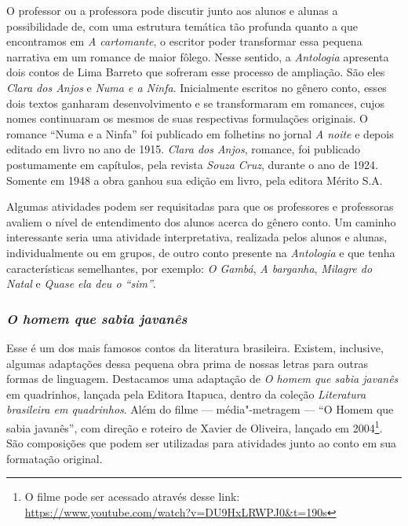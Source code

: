\documentclass[11pt]{extarticle}
\begin{document}
{{O professor ou a professora pode discutir junto aos alunos e alunas a
possibilidade de, com uma estrutura temática tão profunda quanto a que
encontramos em {\textit{A cartomante}}, o escritor poder transformar 
essa pequena narrativa em um romance de maior fôlego. Nesse
sentido, a \emph{Antologia} apresenta dois contos de Lima Barreto que
sofreram esse processo de ampliação. São eles {\textit{Clara dos
Anjos}} e {\textit{Numa e a Ninfa}}. Inicialmente escritos no
gênero conto, esses dois textos ganharam desenvolvimento e se
transformaram em romances, cujos nomes continuaram os mesmos de suas
respectivas formulações originais. O romance ``Numa e a Ninfa'' foi
publicado em folhetins no jornal \emph{A noite} e depois editado em
livro no ano de 1915. \emph{Clara dos Anjos}, romance, foi publicado
postumamente em capítulos, pela revista \emph{Souza Cruz}, durante o ano
de 1924. Somente em 1948 a obra ganhou sua edição em livro, pela editora
Mérito S.A.










Algumas atividades podem ser requisitadas para que os professores e
professoras avaliem o nível de entendimento dos alunos acerca do gênero
conto. Um caminho interessante seria uma atividade interpretativa,
realizada pelos alunos e alunas, individualmente ou em grupos, de outro
conto presente na \emph{Antologia} e que tenha características
semelhantes, por exemplo: {\textit{O Gambá}}, {\textit{A
barganha}}, {\textit{Milagre do Natal}} e {\textit{Quase ela
deu o ``sim''}}.

\subsubsection{\textit{O homem que sabia javanês}}

Esse é um dos mais famosos contos da literatura brasileira. Existem,
inclusive, algumas adaptações dessa pequena obra prima de nossas letras
para outras formas de linguagem. Destacamos uma adaptação de
{\textit{O homem que sabia javanês}} em quadrinhos, lançada pela
Editora Itapuca, dentro da coleção \emph{Literatura brasileira em
quadrinhos}. Além do filme --- média"-metragem --- ``O Homem que sabia
javanês'', com direção e roteiro de Xavier de Oliveira, lançado em
2004\footnote{O filme pode ser acessado através desse link:
  \url{https://www.youtube.com/watch?v=DU9HxLRWPJ0\&t=190s}}. São
composições que podem ser utilizadas para atividades junto ao conto em
sua formatação original.

}}
\end{document}
